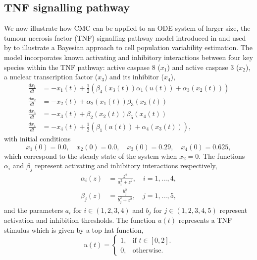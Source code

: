 \subsection{TNF signalling pathway}
We now illustrate how CMC can be applied to an ODE system of larger size, the tumour necrosis factor (TNF) signalling pathway model introduced in \cite{chaves2008bistable} and used by \cite{hasenauer2011identification} to illustrate a Bayesian approach to cell population variability estimation. The model incorporates known activating and inhibitory interactions between four key species within the TNF pathway: active caspase 8 ($x_1$) and active caspase 3 ($x_2$), a nuclear transcription factor ($x_3$) and its inhibitor ($x_4$),
%
\begin{equation}\label{eq:tnf}
\begin{aligned}
\frac{dx_1}{dt} &= -x_1(t) + \frac{1}{2}\left(\beta_4(x_3(t))\alpha_1(u(t)) + \alpha_3(x_2(t))\right)\\
\frac{dx_2}{dt} &= -x_2(t) + \alpha_2(x_1(t)) \beta_3(x_3(t))\\
\frac{dx_3}{dt} &= -x_3(t) + \beta_2(x_2(t)) \beta_5(x_4(t))\\
\frac{dx_4}{dt} &= -x_4(t) + \frac{1}{2}\left(\beta_1(u(t)) + \alpha_4(x_3(t))\right),
\end{aligned}
\end{equation}
%
with initial conditions
\begin{equation}
x_1(0)=0.0, \quad x_2(0)=0.0, \quad x_3(0)=0.29, \quad x_4(0)=0.625,
\end{equation}
which correspond to the steady state of the system when $x_2=0$. The functions $\alpha_i$ and $\beta_j$ represent activating and inhibitory interactions respectively,
%
\begin{equation}
\begin{aligned}
\alpha_i(z) &= \frac{z^2}{a_i^2 + z^2}, \quad i=1, \dots, 4,\\
\beta_j(z)  &= \frac{b_j^2}{b_j^2 + z^2}, \quad j = 1, \dots, 5,
\end{aligned}
\end{equation}
%
and the parameters $a_i$ for $i\in(1,2,3,4)$ and $b_j$ for $j\in(1,2,3,4,5)$ represent activation and inhibition thresholds. The function $u(t)$ represents a TNF stimulus which is given by a top hat function,
%
\begin{equation}
u(t)=\begin{cases}
1, & \text{if $t\in[0,2]$}.\\
0, & \text{otherwise}.
\end{cases}
\end{equation}
